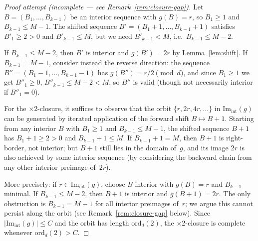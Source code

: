 \documentclass[12pt, a4paper]{amsart}
\theoremstyle{plain}
\theoremstyle{definition}
\theoremstyle{remark}
\newcommand{\ord}{\mathrm{ord}}
\begin{document}
\begin{proof}[Proof attempt (incomplete — see Remark~\ref{rem:closure-gap})]
  Let $B = (B_1, \ldots, B_{k-1})$ be an interior sequence
  with $g(B) = r$, so $B_1 \geq 1$ and $B_{k-1} \leq M - 1$.
  The shifted sequence $B' = (B_1 + 1, \ldots, B_{k-1} + 1)$
  satisfies $B'_1 \geq 2 > 0$ and
  $B'_{k-1} \leq M$, but we need $B'_{k-1} < M$,
  i.e.\ $B_{k-1} \leq M - 2$.

  If $B_{k-1} \leq M - 2$, then $B'$ is interior and
  $g(B') = 2r$ by Lemma~\ref{lem:shift}.
  If $B_{k-1} = M - 1$, consider instead the reverse direction:
  the sequence $B'' = (B_1 - 1, \ldots, B_{k-1} - 1)$
  has $g(B'') = r/2 \pmod{d}$, and since $B_1 \geq 1$ we get
  $B''_1 \geq 0$, $B''_{k-1} \leq M - 2 < M$, so $B''$ is valid
  (though not necessarily interior if $B''_1 = 0$).

  For the ×2-closure, it suffices to observe that the orbit
  $\{r, 2r, 4r, \ldots\}$ in $\mathrm{Im}_{\mathrm{int}}(g)$
  can be generated by iterated application of the forward shift
  $B \mapsto B + 1$.
  Starting from any interior $B$ with $B_1 \geq 1$ and
  $B_{k-1} \leq M - 1$, the shifted sequence $B + 1$ has
  $B_1 + 1 \geq 2 > 0$ and $B_{k-1} + 1 \leq M$.
  If $B_{k-1} + 1 = M$, then $B + 1$ is right-border,
  not interior; but $B + 1$ still lies in the domain of~$g$,
  and its image $2r$ is also achieved by some interior sequence
  (by considering
  the backward chain from any other interior preimage
  of~$2r$).

  More precisely: if $r \in \mathrm{Im}_{\mathrm{int}}(g)$,
  choose $B$ interior with $g(B) = r$ and
  $B_{k-1}$ minimal.
  If $B_{k-1} \leq M - 2$, then $B + 1$ is interior and
  $g(B + 1) = 2r$.
  The only obstruction is $B_{k-1} = M - 1$ for all interior
  preimages of~$r$; we argue this cannot persist along the
  orbit (see Remark~\ref{rem:closure-gap} below).
  Since $|\mathrm{Im}_{\mathrm{int}}(g)| \leq C$ and the
  orbit has length $\ord_d(2)$, the ×2-closure is complete
  whenever $\ord_d(2) > C$.
\end{proof}
\end{document}
